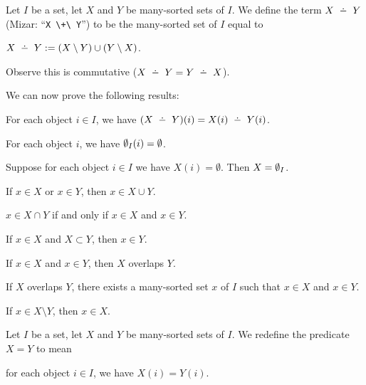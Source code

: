 \documentclass{article}
\begin{document}
\begin{definition}
  Let $I$ be a set, let $X$ and $Y$ be many-sorted sets of $I$.
  We define the term $X\symdiff Y$ (Mizar: ``\verb#X \+\ Y#'') to be the
  many-sorted set of $I$ equal to
  \begin{defn}
  \item $X\symdiff Y:=(X\setminus Y)\cup(Y\setminus X)$.
  \end{defn}
  Observe this is commutative ($X\symdiff Y=Y\symdiff X$).
\end{definition}

We can now prove the following results:
\begin{thm}
\item\label{pboole:4} For each object $i\in I$, we have $(X\symdiff Y)(i)=X(i)\symdiff Y(i)$.
\item\label{pboole:5} For each object $i$, we have $\emptyset_{I}(i)=\emptyset$.
\item\label{pboole:6} Suppose for each object $i\in I$ we have $X(i)=\emptyset$.
  Then $X=\emptyset_{I}$.
\item\label{pboole:7} If $x\in X$ or $x\in Y$, then $x\in X\cup Y$.
\item\label{pboole:8} $x\in X\cap Y$ if and only if $x\in X$ and $x\in Y$.
\item\label{pboole:9} If $x\in X$ and $X\subset Y$, then $x\in Y$.
\item\label{pboole:10} If $x\in X$ and $x\in Y$, then $X$ overlaps $Y$.
\item\label{pboole:11} If $X$ overlaps $Y$, there exists a many-sorted
  set $x$ of $I$ such that $x\in X$ and $x\in Y$.
\item\label{pboole:12} If $x\in X\setminus Y$, then $x\in X$.
\end{thm}

\begin{definition}
Let $I$ be a set, let $X$ and $Y$ be many-sorted sets of $I$.
We redefine the predicate $X=Y$ to mean
\begin{defn}
\item for each object $i\in I$, we have $X(i)=Y(i)$.
\end{defn}
\end{definition}
\end{document}
